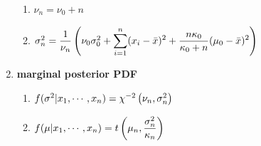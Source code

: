 \begin{enumerate}
\begin{enumerate}
        \item $\nu_n = \nu_0 + n$
        \hfill \cite{statistics/book/Statistics-for-Data-Scientists/Maurits-Kaptein}
        
        \item $\sigma^2 _n = \dfrac{1 }{\nu_ n} \left(\nu_0\sigma^2_0 + \displaystyle\sum^n_{i=1} (x_ i - \bar{x})^2 + \dfrac{n\kappa_0}{\kappa_0 + n} (\mu_0 - \bar{x})^2\right)$
        \hfill \cite{statistics/book/Statistics-for-Data-Scientists/Maurits-Kaptein}
    \end{enumerate}

    \item \textbf{marginal posterior PDF}
    \hfill \cite{statistics/book/Statistics-for-Data-Scientists/Maurits-Kaptein}
    \begin{multicols}{2}
    \begin{enumerate}
        \item $f (\sigma^2|x_1, \cdots , x_n ) = \chi^{-2}\left(\nu_n , \sigma^2_n\right) $
        \hfill \cite{statistics/book/Statistics-for-Data-Scientists/Maurits-Kaptein}
    
        \item $f (\mu|x_1, \cdots , x_n ) = t\left(\mu_n , \dfrac{\sigma^2_n}{\kappa_n}\right) $
        \hfill \cite{statistics/book/Statistics-for-Data-Scientists/Maurits-Kaptein}
    \end{enumerate}
    \end{multicols}
\end{enumerate}






